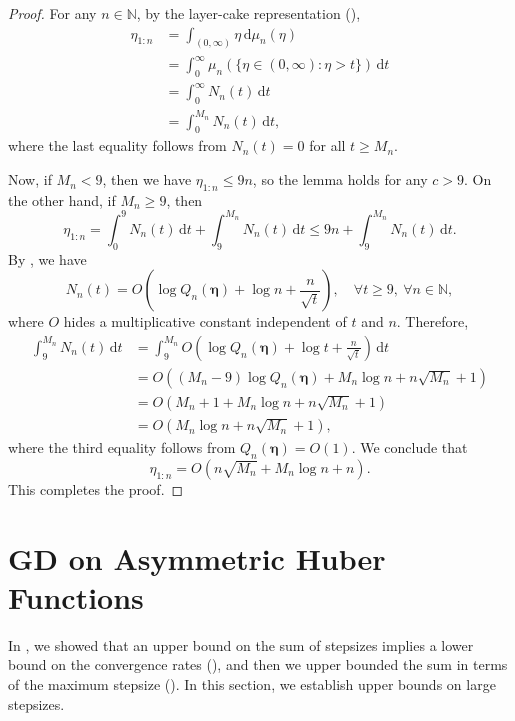 \documentclass[11pt]{article}
\newcommand{\N}{\mathbb{N}}
\newcommand{\du}{\mathrm{d}}
\newcommand{\schedule}{\bm{\eta}}
\begin{document}
\begin{proof}
For any $n\in\N$, by the layer-cake representation (),
\begin{align*}
	\eta_{1:n}
	&= \int_{(0,\infty)} \eta \, \du \mu_n(\eta)\\
	&= \int_0^\infty \mu_n\left( \{ \eta\in(0,\infty): \eta > t \} \right)\, \du t \\
	&= \int_0^\infty N_n(t)\,\du t \\
	&= \int_0^{M_n} N_n(t)\,\du t,
\end{align*}
where the last equality follows from $N_n(t)=0$ for all $t\geq M_n$.


Now, if $M_n < 9$, then we have $\eta_{1:n} \leq 9n$, so the lemma holds for any $c>9$.
On the other hand, if $M_n\geq 9$, then
\[
    \eta_{1:n}
    = \int_0^9 N_n(t)\,\du t + \int_9^{M_n} N_n(t)\,\du t
    \leq 9n + \int_9^{M_n} N_n(t)\,\du t.
\]
By , we have
\[
	N_n(t) = O\left(\log Q_n(\schedule) + \log n + \frac{n}{\sqrt{t}} \right), \quad\forall t\geq 9,\ \forall n\in\N,
\]
where $O$ hides a multiplicative constant independent of $t$ and $n$.
Therefore,
\begin{align*}
    \int_9^{M_n} N_n(t)\,\du t
	&=  \int_9^{M_n} O\left(\log Q_n(\schedule) + \log t + \frac{n}{\sqrt{t}} \right) \,\du t \\
	&= O\left( (M_n-9)\log Q_n(\schedule) + M_n\log n + n\sqrt{M_n} + 1 \right) \\
    &= O\left( M_n + 1 + M_n\log n + n\sqrt{M_n} + 1 \right) \\
	&= O\left( M_n\log n + n\sqrt{M_n} + 1 \right),
\end{align*}
where the third equality follows from $Q_n(\schedule)=O(1)$.
We conclude that
\[
	\eta_{1:n} = O\left( n\sqrt{M_n} + M_n\log n + n \right).
\]
This completes the proof.
\end{proof}


\section{GD on Asymmetric Huber Functions}\label{sec:asymmetric_huber}

In , we showed that an upper bound on the sum of stepsizes implies a lower bound on the convergence rates (), and then we upper bounded the sum in terms of the maximum stepsize ().
In this section, we establish upper bounds on large stepsizes.
\end{document}
